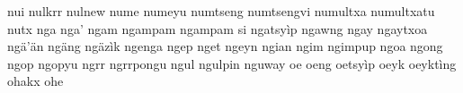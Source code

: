 nui\hspace{2mm}
nulkrr\hspace{2mm}
nulnew\hspace{2mm}
nume\hspace{2mm}
numeyu\hspace{2mm}
numtseng\hspace{2mm}
numtsengvi\hspace{2mm}
numultxa\hspace{2mm}
numultxatu\hspace{2mm}
nutx\hspace{2mm}
nga\hspace{2mm}
nga'\hspace{2mm}
ngam\hspace{2mm}
ngampam\hspace{2mm}
ngampam si\hspace{2mm}
ngatsyìp\hspace{2mm}
ngawng\hspace{2mm}
ngay\hspace{2mm}
ngaytxoa\hspace{2mm}
ngä'än\hspace{2mm}
ngäng\hspace{2mm}
ngäzìk\hspace{2mm}
ngenga\hspace{2mm}
ngep\hspace{2mm}
nget\hspace{2mm}
ngeyn\hspace{2mm}
ngian\hspace{2mm}
ngim\hspace{2mm}
ngimpup\hspace{2mm}
ngoa\hspace{2mm}
ngong\hspace{2mm}
ngop\hspace{2mm}
ngopyu\hspace{2mm}
ngrr\hspace{2mm}
ngrrpongu\hspace{2mm}
ngul\hspace{2mm}
ngulpin\hspace{2mm}
nguway\hspace{2mm}
oe\hspace{2mm}
oeng\hspace{2mm}
oetsyìp\hspace{2mm}
oeyk\hspace{2mm}
oeyktìng\hspace{2mm}
ohakx\hspace{2mm}
ohe\hspace{2mm}
